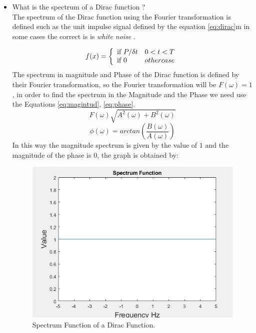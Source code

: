 \documentclass[12pt, twoside]{report}
\begin{document}
\begin{itemize}
    \item What is the spectrum of a Dirac function ?\\
    The spectrum of the Dirac function using the Fourier transformation is defined such as the unit impulse signal defined by the equation \ref{eq:dirac}m in some cases the correct is is \textit{white noise} \cite{Coburn1999}.
    
    
    \begin{equation}
f(x) = \left\lbrace
\begin{array}{ll}
\textup{if } P/\delta t & 0<t<T\\
\textup{if } 0 & othercase
\end{array}
\right.
\label{eq:dirac}
\end{equation}
The spectrum in magnitude and Phase of the Dirac function is defined by their Fourier transformation, so the Fourier transformation will be $F(\omega)=1$, in order to find the spectrum in the Magnitude and the Phase we need use the Equations \ref{eq:magintud}, \ref{eq:phase}.\\
\begin{equation}
    F(\omega)\sqrt{A^{2}(\omega)+B^{2}(\omega)}
    \label{eq:magintud}
\end{equation}
\begin{equation}
    \phi (\omega)=arctan(\dfrac{B(\omega)}{A(\omega)})
    \label{eq:phase}
\end{equation}
In this way the magnitude spectrum is given by the value of $1$ and the magnitude of the phase is $0$, the graph is obtained by:\\
\begin{figure}[!h]
    \centering
  \includegraphics[scale=0.9]{images/spectrumfunct.png}
  \caption{Spectrum Function of a Dirac Function.}
  \label{fig:scheme1}
\end{figure}





\end{itemize}
\end{document}
